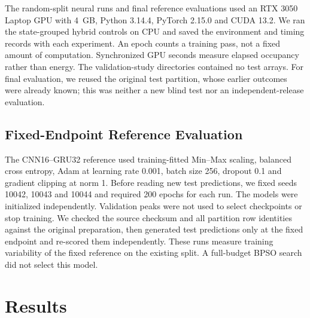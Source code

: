 The random-split neural runs and final reference evaluations used an RTX 3050 Laptop GPU with 4~GB, Python 3.14.4, PyTorch 2.15.0 and CUDA 13.2. We ran the state-grouped hybrid controls on CPU and saved the environment and timing records with each experiment. An epoch counts a training pass, not a fixed amount of computation. Synchronized GPU seconds measure elapsed occupancy rather than energy. The validation-study directories contained no test arrays. For final evaluation, we reused the original test partition, whose earlier outcomes were already known; this was neither a new blind test nor an independent-release evaluation.

\subsection{Fixed-Endpoint Reference Evaluation}
The CNN16--GRU32 reference used training-fitted Min--Max scaling, balanced cross entropy, Adam at learning rate 0.001, batch size 256, dropout 0.1 and gradient clipping at norm 1. Before reading new test predictions, we fixed seeds 10042, 10043 and 10044 and required 200 epochs for each run. The models were initialized independently. Validation peaks were not used to select checkpoints or stop training. We checked the source checksum and all partition row identities against the original preparation, then generated test predictions only at the fixed endpoint and re-scored them independently. These runs measure training variability of the fixed reference on the existing split. A full-budget BPSO search did not select this model.

\section{Results}
